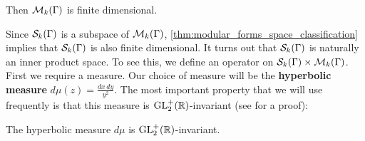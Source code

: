       \begin{theorem}\label{thm:modular_forms_space_classification}
        Then $\mathcal{M}_{k}(\Gamma)$ is finite dimensional.
      \end{theorem}

      Since $\mathcal{S}_{k}(\Gamma)$ is a subspace of $\mathcal{M}_{k}(\Gamma)$, \cref{thm:modular_forms_space_classification} implies that $\mathcal{S}_{k}(\Gamma)$ is also finite dimensional. It turns out that $\mathcal{S}_{k}(\Gamma)$ is naturally an inner product space. To see this, we define an operator on $\mathcal{S}_{k}(\Gamma) \times \mathcal{M}_{k}(\Gamma)$. First we require a measure. Our choice of measure will be the \textbf{hyperbolic measure} $d\mu(z) = \frac{dx\,dy}{y^{2}}$. The most important property that we will use frequently is that this measure is $\mathrm{GL}_{2}^{+}(\mathbb{R})$-invariant (see \cite{diamond2005first} for a proof):

      \begin{proposition}
        The hyperbolic measure $d\mu$ is $\mathrm{GL}_{2}^{+}(\mathbb{R})$-invariant.
      \end{proposition}

